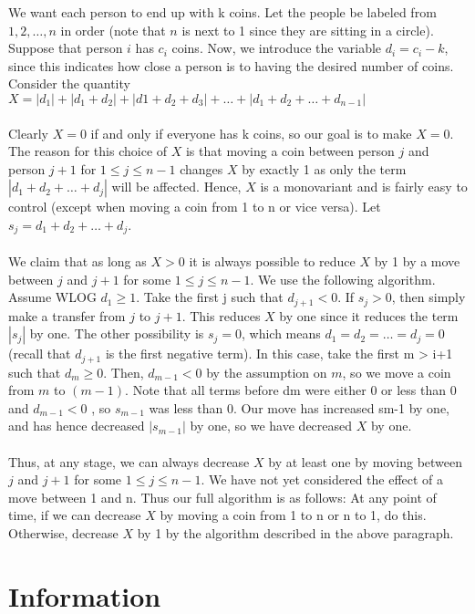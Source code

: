 \sol We want each person to end up with k coins. Let the people be labeled from $1, 2, \dots, n$ in order (note that $n$ is next to 1 since they are sitting in a circle). Suppose that person $i$ has $c_i$ coins. Now, we introduce the variable $d_i = c_i - k$, since this indicates how close a person is to having the desired number of coins. Consider the quantity $X = |d_1| + |d_1 + d_2| + |d1 + d_2 + d_3| + \dots + |d_1 + d_2 + \dots + d_{n-1}|$
\\\\
Clearly $X = 0$ if and only if everyone has k coins, so our goal is to make $X = 0$. The reason for this choice of $X$ is that moving a coin between person $j$ and person $j + 1$ for $1 \leq j \leq n -1$ changes $X$ by exactly 1 as only the term $|d_1 + d_2 + \dots + d_j|$ will be affected. Hence, $X$ is a monovariant and is fairly easy to control (except when moving a coin from 1 to n or vice versa). Let $s_j = d_1 + d_2 + \dots + d_j$.
\\\\
We claim that as long as $X > 0$ it is always possible to reduce $X$ by 1 by a move between $j$ and $j +1$ for some $1 \leq j \leq n -1$. We use the following algorithm. Assume WLOG $d_1 \geq 1$. Take the first j such that $d_{j+1} < 0$. If $s_j > 0$, then simply make a transfer from $j$ to $j + 1$. This reduces $X$ by one since it reduces the term $|s_j|$ by one. The other possibility is $s_j = 0$, which means $d_1 = d_2 = \dots = d_j = 0$ (recall that $d_{j+1}$ is the first negative term). In this case, take the first m > i+1 such that $d_m \geq 0$. Then, $d_{m-1} < 0$ by the assumption on $m$, so we move a coin from $m$ to $(m-1)$. Note that all terms before dm were either 0 or less than 0 and $d_{m-1} < 0$ , so $s_{m-1}$ was less than 0. Our move has increased sm-1 by one, and has hence decreased $|s_{m-1}|$ by one, so we have decreased $X$ by one.
\\\\
Thus, at any stage, we can always decrease $X$ by at least one by moving between $j$ and $j +1$ for some $1 \le j \le n -1$. We have not yet considered the effect of a move between 1 and n. Thus our full algorithm is as follows: At any point of time, if we can decrease $X$ by moving a coin from 1 to n or n to 1, do this. Otherwise, decrease $X$ by 1 by the algorithm described in the above paragraph.

\newpage

\section{Information}

